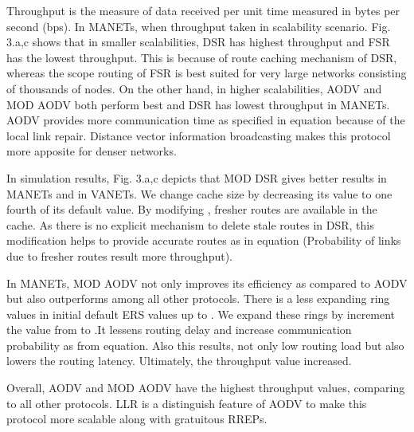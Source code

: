 \documentclass[journal]{IEEEtran}
\begin{document}
Throughput is the measure of data received per unit time measured in bytes per second (bps). In MANETs, when throughput taken in scalability scenario.
Fig. 3.a,c shows that in smaller scalabilities, DSR has  highest throughput and FSR has the lowest throughput. This is because of route caching mechanism of DSR, whereas the scope routing of FSR is best suited for very large networks consisting of thousands of nodes. On the other hand, in higher scalabilities, AODV and MOD AODV both perform best and DSR has lowest throughput in MANETs. AODV provides more communication time as specified in equation because of the local link repair. Distance vector information broadcasting makes this protocol more apposite for denser networks.

In simulation results, Fig. 3.a,c depicts that MOD DSR gives better results in MANETs and in VANETs. We change cache size by decreasing its value to one fourth of its default value. By modifying , fresher routes are available in the cache. As there is no explicit mechanism to delete stale routes in DSR, this modification helps to provide accurate routes as in equation (Probability of links due to fresher routes result more throughput).

In MANETs, MOD AODV not only improves its efficiency as compared to AODV but also outperforms among all other protocols. There is a less expanding ring values in initial default ERS values up to . We expand these rings by increment the  value from  to .It lessens routing delay and increase communication probability as from equation. Also this results, not only low routing load but also lowers the routing latency. Ultimately, the throughput value increased.

Overall, AODV and MOD AODV have the highest throughput values, comparing to all other protocols. LLR is a distinguish feature of AODV to make this protocol more scalable along with gratuitous RREPs.

\small
\vspace{0.05cm}
\end{document}
